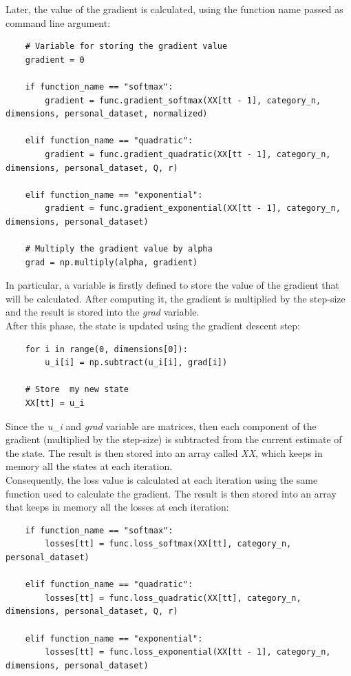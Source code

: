 \documentclass[a4paper,11pt,oneside]{book}
\begin{document}
Later, the value of the gradient is calculated, using the function name passed as command line argument:
\begin{lstlisting}
    # Variable for storing the gradient value    
    gradient = 0

    if function_name == "softmax":
        gradient = func.gradient_softmax(XX[tt - 1], category_n, dimensions, personal_dataset, normalized)
	
    elif function_name == "quadratic":
        gradient = func.gradient_quadratic(XX[tt - 1], category_n, dimensions, personal_dataset, Q, r)
	
    elif function_name == "exponential":
        gradient = func.gradient_exponential(XX[tt - 1], category_n, dimensions, personal_dataset)
	
    # Multiply the gradient value by alpha
    grad = np.multiply(alpha, gradient)
\end{lstlisting}
In particular, a variable is firstly defined to store the value of the gradient that will be calculated. After computing it, the gradient is multiplied by the step-size and the result is stored into the \textit{grad} variable. \\

After this phase, the state is updated using the gradient descent step:
\begin{lstlisting}
    for i in range(0, dimensions[0]):
        u_i[i] = np.subtract(u_i[i], grad[i])

    # Store  my new state
    XX[tt] = u_i
\end{lstlisting}
Since the \textit{u\_i} and \textit{grad} variable are matrices, then each component of the gradient (multiplied by the step-size) is subtracted from the current estimate of the state. The result is then stored into an array called \textit{XX}, which keeps in memory all the states at each iteration. \\

Consequently, the loss value is calculated at each iteration using the same function used to calculate the gradient. The result is then stored into an array that keeps in memory all the losses at each iteration:
\begin{lstlisting}
    if function_name == "softmax":
        losses[tt] = func.loss_softmax(XX[tt], category_n, personal_dataset)

    elif function_name == "quadratic":
        losses[tt] = func.loss_quadratic(XX[tt], category_n, dimensions, personal_dataset, Q, r)

    elif function_name == "exponential":
        losses[tt] = func.loss_exponential(XX[tt - 1], category_n, dimensions, personal_dataset)
\end{lstlisting}
\end{document}
